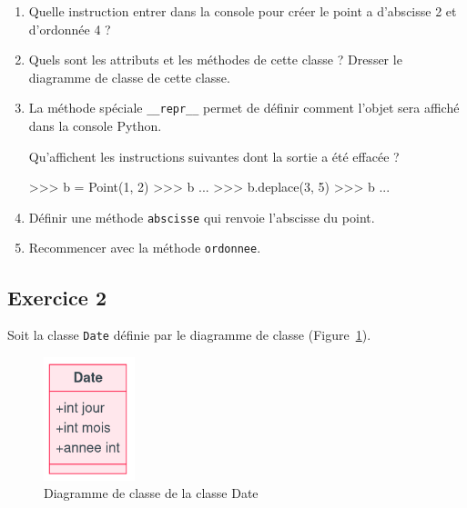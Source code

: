 \documentclass[
  letterpaper,
  DIV=11,
  numbers=noendperiod]{scrartcl}
\newenvironment{Shaded}{\begin{snugshade}}{\end{snugshade}}
\newcommand{\DecValTok}[1]{\textcolor[rgb]{0.68,0.00,0.00}{#1}}
\newcommand{\NormalTok}[1]{\textcolor[rgb]{0.00,0.23,0.31}{#1}}
\newcommand{\OperatorTok}[1]{\textcolor[rgb]{0.37,0.37,0.37}{#1}}
\begin{document}
\begin{enumerate}
\def\labelenumi{\arabic{enumi}.}
\item
  Quelle instruction entrer dans la console pour créer le point a
  d'abscisse 2 et d'ordonnée 4 ?
\item
  Quels sont les attributs et les méthodes de cette classe ? Dresser le
  diagramme de classe de cette classe.
\item
  La méthode spéciale \texttt{\_\_repr\_\_} permet de définir comment
  l'objet sera affiché dans la console Python.

  Qu'affichent les instructions suivantes dont la sortie a été effacée ?

\begin{Shaded}
\begin{Highlighting}[]
\OperatorTok{\textgreater{}\textgreater{}\textgreater{}}\NormalTok{ b }\OperatorTok{=}\NormalTok{ Point(}\DecValTok{1}\NormalTok{, }\DecValTok{2}\NormalTok{)}
\OperatorTok{\textgreater{}\textgreater{}\textgreater{}}\NormalTok{ b}
\NormalTok{...}
\OperatorTok{\textgreater{}\textgreater{}\textgreater{}}\NormalTok{ b.deplace(}\DecValTok{3}\NormalTok{, }\DecValTok{5}\NormalTok{)}
\OperatorTok{\textgreater{}\textgreater{}\textgreater{}}\NormalTok{ b}
\NormalTok{...}
\end{Highlighting}
\end{Shaded}
\item
  Définir une méthode \texttt{abscisse} qui renvoie l'abscisse du point.
\item
  Recommencer avec la méthode \texttt{ordonnee}.
\end{enumerate}

\hypertarget{fa-desktop-exercice-2}{%
\subsection{\texorpdfstring{ Exercice
2}{ Exercice 2}}\label{fa-desktop-exercice-2}}

Soit la classe \texttt{Date} définie par le diagramme de classe
(Figure~\ref{fig-classe}).

\begin{figure}[h]

{\centering \includegraphics[width=1.04167in,height=\textheight]{classe_mermaid_exo.png}

}

\caption{\label{fig-classe}Diagramme de classe de la classe Date}

\end{figure}
\end{document}
